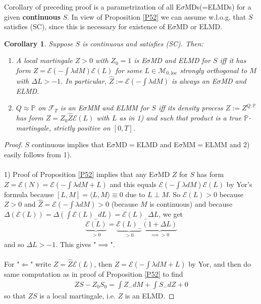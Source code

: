 \documentclass[12pt,a4paper, twoside]{article}
\newtheorem{cor}{Corollary}[section]
\theoremstyle{definition}
\newcommand{\PP}{\mathbb{P}} %
\begin{document}
\newpage
Corollary of preceding proof is a parametrization of all E$\sigma$MDs(=ELMDs) for a given \textbf{continuous} $S$. In view of Proposition \ref{P52} we can assume w.l.o.g. that $S$ satisfies (SC), since this is necessary for existence of E$\sigma$MD or ELMD. 
\begin{cor}\label{C53} Suppose $S$ is continuous and satisfies (SC). Then:
\begin{enumerate}
\item A local martingale $Z >0$ with $Z_0=1$ is E$\sigma$MD and ELMD for $S$ iff it has form $Z = \mathcal{E}(- \int \lambda d M) \mathcal{E}(L)$ for some $L \in \mathcal{M}_{0, \text{loc}}$ strongly orthogonal to $M$ with $\Delta L > -1$. In particular, $\hat{Z}:= \mathcal{E}(- \int \lambda dM)$ is always an E$\sigma$MD and ELMD. 
\item $Q \approx \PP$ on $\mathcal{F}_T$ is an E$\sigma$MM and ELMM for $S$ iff its density process $Z:= Z^{Q;  \PP}$ has form $Z = Z_0 \hat{Z} \mathcal{E}(L)$ with $L$ as in 1) and such that product is a true $\PP$-martingale, strictly positive on $[0,T]$. 
\end{enumerate}
\end{cor}
\begin{proof}
$S$ continuous implies that E$\sigma$MD$=$ELMD and E$\sigma$MM$=$ELMM and 2) easily follows from 1).
\\\\
1) Proof of Proposition \ref{P52} implies that any E$\sigma$MD $Z$ for $S$ has form $Z = \mathcal{E}(N)= \mathcal{E}(- \int \lambda dM +L )$ and this equals $\mathcal{E}( - \int \lambda dM) \mathcal{E}(L)$ by Yor's formula because $[L,M]= \langle L,M \rangle \equiv 0$ due to $L \perp M$. So $\mathcal{E}(L) >0$ because $Z>0$ and $\hat{Z} = \mathcal{E}(- \int \lambda dM) >0$ (because $M$ is continuous) and because $\Delta ( \mathcal{E}(L))= \Delta ( \int \mathcal{E}(L)_-dL) = \mathcal{E}(L)_- \Delta L$, we get  
\begin{align*}
\underbrace{\mathcal{E}(L)}_{>0} = \underbrace{\mathcal{E}(L)_-}_{>0} \underbrace{(1 + \Delta L)}_{\implies >0}
\end{align*}
and so $\Delta L >-1$. This gives "$\implies$". 
\\\\
For "$\Longleftarrow$" write $Z= \hat{Z} \mathcal{E}(L)$, then $Z = \mathcal{E}(- \int \lambda dM + L)$ by Yor, and then do same computation as in proof of Proposition \ref{P52} to find 
\begin{align*}
ZS-Z_0S_0 = \int Z_-dM + \int S_- dZ + 0
\end{align*}
so that $ZS$ is a local martingale, i.e. $Z$ is an ELMD. 
\end{proof}
\end{document}

